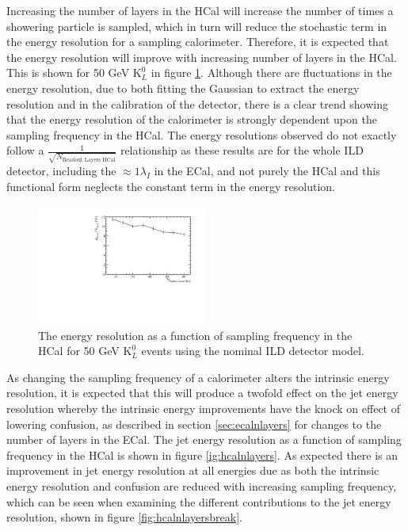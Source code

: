 Increasing the number of layers in the HCal will increase the number of times a showering particle is sampled, which in turn will reduce the stochastic term in the energy resolution for a sampling calorimeter.  Therefore, it is expected that the energy resolution will improve with increasing number of layers in the HCal.  This is shown for 50 GeV $\text{K}^{0}_{L}$ in figure \ref{fig:hcalnlayerser}.  Although there are fluctuations in the energy resolution, due to both fitting the Gaussian to extract the energy resolution and in the calibration of the detector, there is a clear trend showing that the energy resolution of the calorimeter is strongly dependent upon the sampling frequency in the HCal.   The energy resolutions observed do not exactly follow a $\frac{1}{\sqrt{N_{\text{Readout Layers HCal}}}}$ relationship as these results are for the whole ILD detector, including the $\approx 1 \lambda_{I}$ in the ECal, and not purely the HCal and this functional form neglects the constant term in the energy resolution.  

\begin{figure}
\centering
\includegraphics[width=0.5\textwidth]{OptimisationStudies/Plots/EnergyResolution/ER_vs_NHCalVariableLayers_50GeVKaon0L.pdf}
\caption[The energy resolution as a function of sampling frequency in the HCal for 50 GeV $\text{K}^{0}_{L}$ events using the nominal ILD detector model.]{The energy resolution as a function of sampling frequency in the HCal for 50 GeV $\text{K}^{0}_{L}$ events using the nominal ILD detector model.}
\label{fig:hcalnlayerser}
\end{figure}

As changing the sampling frequency of a calorimeter alters the intrinsic energy resolution, it is expected that this will produce a twofold effect on the jet energy resolution whereby the intrinsic energy improvements have the knock on effect of lowering confusion, as described in section \ref{sec:ecalnlayers} for changes to the number of layers in the ECal.  The jet energy resolution as a function of sampling frequency in the HCal is shown in figure \ref{ig:hcalnlayers}.  As expected there is an improvement in jet energy resolution at all energies due as both the intrinsic energy resolution and confusion are reduced with increasing sampling frequency, which can be seen when examining the different contributions to the jet energy resolution, shown in figure \ref{fig:hcalnlayersbreak}.  

